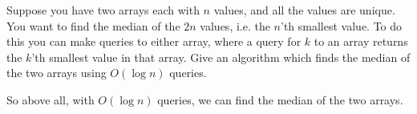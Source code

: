 \problem{}
Suppose you have two arrays each with $n$ values, and all the values are unique.  You want to find the median of the $2n$ values, i.e. the $n$'th smallest value.  To do this you can make queries to either array, where a query for $k$ to an array returns the $k$'th smallest value in that array.  Give an algorithm which finds the median of the two arrays using $O(\log n)$ queries.  

\solution{}










So above all, with $O(\log n)$ queries, we can find the median of the two arrays.\\

\newpage

